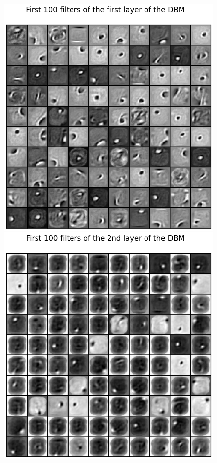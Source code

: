 \begin{figure}[h!]
\begin{minipage}[t]{0.19\textwidth}
        \includegraphics[width=\textwidth]{figures/dbm-layer1-features.png}
    \end{minipage}
    \hfill
    \begin{minipage}[t]{0.19\textwidth}
        \includegraphics[width=\textwidth]{figures/dbm-layer2-features.png}

\end{minipage}
\end{figure}
